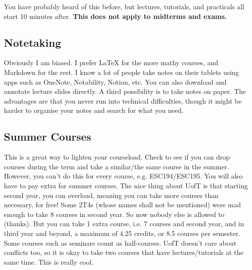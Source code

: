 You have probably heard of this before, but lectures, tutorials, and practicals all start 10 minutes after. \textbf{This does not apply to midterms and exams.}

\subsection{Notetaking}

Obviously I am biased. I prefer LaTeX for the more mathy courses, and Markdown for the rest. I know a lot of people take notes on their tablets using apps such as OneNote, Notability, Notion, etc. You can also download and annotate lecture slides directly. A third possibility is to take notes on paper. The advantages are that you never run into technical difficulties, though it might be harder to organise your notes and search for what you need.

\subsection{Summer Courses}

This is a great way to lighten your courseload. Check to see if you can drop courses during the term and take a similar/the same course in the summer. However, you can't do this for every course, e.g. ESC194/ESC195. You will also have to pay extra for summer courses. The nice thing about UofT is that starting second year, you can overload, meaning you can take more courses than necessary, for free! Some 2T4s (whose names shall not be mentioned) were mad enough to take 8 courses in second year. So now nobody else is allowed to (thanks). But you can take 1 extra course, i.e. 7 courses and second year, and in third year and beyond, a maximum of 4.25 credits, or 8.5 courses per semester. Some courses such as seminars count as half-courses. UofT doesn't care about conflicts too, so it is okay to take two courses that have lectures/tutorials at the same time. This is really cool.

